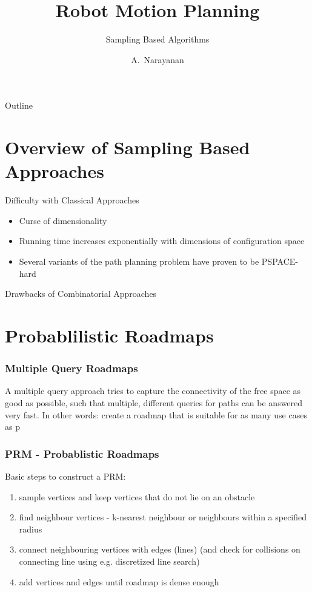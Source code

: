 \documentclass{beamer}
\title[RMP v\var{version}]
{Robot Motion Planning}
\subtitle
{Sampling Based Algorithms}
\author[Narayanan]
{A.~Narayanan\inst{1}}
\institute[Technical University of Munich]
{
  \inst{1}
  Department of Informatics\\
}
\begin{document}
\begin{frame}
    \titlepage
  \end{frame}
  
  \begin{frame}{Outline}
    \tableofcontents
  \end{frame}

  \section{Overview of Sampling Based Approaches}

  \begin{frame}{Difficulty with Classical Approaches}
    \begin{itemize}
      \item Curse of dimensionality
      \item Running time increases exponentially with dimensions of configuration space
      \item Several variants of the path planning problem have proven to be PSPACE-hard
    \end{itemize}
  \end{frame}

  \begin{frame}{Drawbacks of Combinatorial Approaches}
    
  \end{frame}

  \section[PRMs]{Probablilistic Roadmaps}

  \begin{frame}
    \frametitle{Multiple Query Roadmaps}
    A multiple query approach tries to capture the connectivity of the
free space as good as possible, such that multiple, different queries
for paths can be answered very fast. In other words: create a
roadmap that is suitable for as many use cases as p
    
  \end{frame}

  \begin{frame}
    \frametitle{PRM - Probablistic Roadmaps}
    Basic steps to construct a PRM:
    \begin{enumerate}
      \item sample vertices and keep vertices that do not lie on an obstacle
      \item find neighbour vertices - k-nearest neighbour or neighbours within a specified radius
      \item connect neighbouring vertices with edges (lines) (and check for collisions on connecting line using e.g. discretized line search)
      \item add vertices and edges until roadmap is dense enough
    \end{enumerate}
  
  \end{frame}
\end{document}
